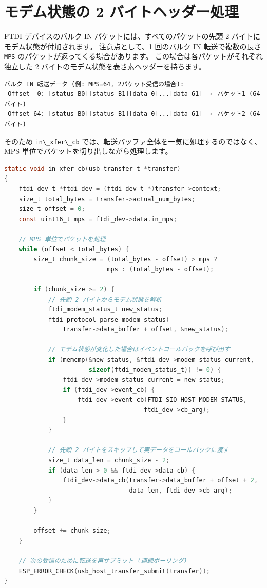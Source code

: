 \documentclass[10pt,twoside,openany,a4j]{ltjsbook}
\newcommand{\passthrough}[1]{#1}
\begin{document}
\section{モデム状態の 2
バイトヘッダー処理}\label{ux30e2ux30c7ux30e0ux72b6ux614bux306e-2-ux30d0ux30a4ux30c8ux30d8ux30c3ux30c0ux30fcux51e6ux7406}

FTDI デバイスのバルク IN パケットには、すべてのパケットの先頭 2
バイトにモデム状態が付加されます。 注意点として、1 回のバルク IN
転送で複数の長さ \passthrough{\lstinline!MPS!}
のパケットが返ってくる場合があります。
この場合は各パケットがそれぞれ独立した 2
バイトのモデム状態を表さ素ヘッダーを持ちます。

\begin{lstlisting}
バルク IN 転送データ (例: MPS=64, 2パケット受信の場合):
 Offset  0: [status_B0][status_B1][data_0]...[data_61]  ← パケット1 (64バイト)
 Offset 64: [status_B0][status_B1][data_0]...[data_61]  ← パケット2 (64バイト)
\end{lstlisting}

そのため \passthrough{\lstinline!in\_xfer\_cb!}
では、転送バッファ全体を一気に処理するのではなく、MPS
単位でパケットを切り出しながら処理します。

\begin{lstlisting}[language=C]
static void in_xfer_cb(usb_transfer_t *transfer)
{
    ftdi_dev_t *ftdi_dev = (ftdi_dev_t *)transfer->context;
    size_t total_bytes = transfer->actual_num_bytes;
    size_t offset = 0;
    const uint16_t mps = ftdi_dev->data.in_mps;

    // MPS 単位でパケットを処理
    while (offset < total_bytes) {
        size_t chunk_size = (total_bytes - offset) > mps ?
                            mps : (total_bytes - offset);

        if (chunk_size >= 2) {
            // 先頭 2 バイトからモデム状態を解析
            ftdi_modem_status_t new_status;
            ftdi_protocol_parse_modem_status(
                transfer->data_buffer + offset, &new_status);

            // モデム状態が変化した場合はイベントコールバックを呼び出す
            if (memcmp(&new_status, &ftdi_dev->modem_status_current,
                       sizeof(ftdi_modem_status_t)) != 0) {
                ftdi_dev->modem_status_current = new_status;
                if (ftdi_dev->event_cb) {
                    ftdi_dev->event_cb(FTDI_SIO_HOST_MODEM_STATUS,
                                      ftdi_dev->cb_arg);
                }
            }

            // 先頭 2 バイトをスキップして実データをコールバックに渡す
            size_t data_len = chunk_size - 2;
            if (data_len > 0 && ftdi_dev->data_cb) {
                ftdi_dev->data_cb(transfer->data_buffer + offset + 2,
                                  data_len, ftdi_dev->cb_arg);
            }
        }

        offset += chunk_size;
    }

    // 次の受信のために転送を再サブミット (連続ポーリング)
    ESP_ERROR_CHECK(usb_host_transfer_submit(transfer));
}
\end{lstlisting}
\end{document}
